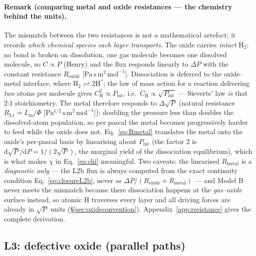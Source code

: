 \documentclass[11pt,a4paper]{article}
\newcommand{\Pint}{P_{\mathrm{int}}}
\newcommand{\Lm}{L_{\mathrm{m}}}
\newcommand{\Rox}{R_{\mathrm{oxide}}}
\newcommand{\Rmet}{R_{\mathrm{metal}}}
\begin{document}
\paragraph{Remark (comparing metal and oxide resistances --- the chemistry
behind the units).} The mismatch between the two resistances is not a
mathematical artefact; it records \emph{which chemical species each layer
transports}. The oxide carries \emph{intact} $\mathrm{H_2}$: no bond is
broken on dissolution, one gas molecule becomes one dissolved molecule, so
$C \propto P$ (Henry) and the flux responds linearly to $\Delta P$ with the
constant resistance $\Rox$ [$\mathrm{Pa\,s\,m^2\,mol^{-1}}$]. Dissociation is
deferred to the oxide--metal interface, where
$\mathrm{H_2} \rightleftharpoons 2\mathrm{H}^{*}$; the law of mass action for
a reaction delivering \emph{two} atoms per molecule gives
$C_{\mathrm{H}}^{2} \propto \Pint$, i.e.\ $C_{\mathrm{H}} \propto
\sqrt{\Pint}$ --- Sieverts' law \emph{is} that 2:1 stoichiometry. The metal
therefore responds to $\Delta\sqrt{P}$ (natural resistance
$R_{\mathrm{L1}} = \Lm/\Phi$ [$\mathrm{Pa^{1/2}\,s\,m^2\,mol^{-1}}$]):
doubling the pressure less than doubles the dissolved-atom population, so per
pascal the metal becomes progressively harder to feed while the oxide does
not. Eq.~\eqref{eq:Rmetal} translates the metal onto the oxide's per-pascal
basis by linearising about $\Pint$ (the factor 2 is
$\mathrm{d}\sqrt{P}/\mathrm{d}P = 1/(2\sqrt{P})$, the marginal yield of the
dissociation equilibrium), which is what makes $\chi$ in Eq.~\eqref{eq:chi}
meaningful. Two caveats: the linearised $\Rmet$ is a \emph{diagnostic only}
--- the L2b flux is always computed from the exact continuity condition
Eq.~\eqref{eq:closureL2b}, never as $\Delta P/(\Rox + \Rmet)$ --- and Model B
never meets the mismatch because there dissociation happens at the
\emph{gas--oxide} surface instead, so atomic H traverses every layer and all
driving forces are already in $\sqrt{P}$ units
(\S\ref{sec:oxideconvention}). Appendix~\ref{app:resistance} gives the
complete derivation.

\subsection{L3: defective oxide (parallel paths)}
\end{document}

